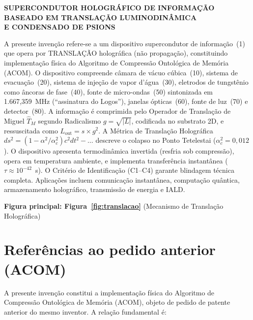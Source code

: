 \documentclass[12pt,a4paper]{article}
\newcommand{\alphaii}{\alpha^2}
\newcommand{\alphac}{\alpha^2_c}
\newcommand{\TM}{\hat{T}_M}
\begin{document}
\begin{center}
{\large\bfseries SUPERCONDUTOR HOLOGRÁFICO DE INFORMAÇÃO\\
BASEADO EM TRANSLAÇÃO LUMINODINÂMICA\\
E CONDENSADO DE PSIONS}
\end{center}

\vspace{0.5cm}

A presente invenção refere-se a um dispositivo supercondutor de
informação~(1) que opera por TRANSLAÇÃO holográfica (não
propagação), constituindo implementação física do Algoritmo de
Compressão Ontológica de Memória (ACOM). O dispositivo
compreende câmara de vácuo cúbica~(10), sistema de evacuação~(20),
sistema de injeção de vapor d'água~(30), eletrodos de tungstênio
como âncoras de fase~(40), fonte de micro-ondas~(50) sintonizada
em 1.667,359~MHz (``assinatura do Logos''), janelas ópticas~(60),
fonte de luz~(70) e detector~(80). A informação é comprimida
pelo Operador de Translação de Miguel $\TM$ segundo Radicalismo
$g = \sqrt{|L|}$, codificada no substrato 2D, e ressuscitada
como $L_{\text{out}} = s \times g^2$. A Métrica de Translação
Holográfica $ds^2 = (1-\alphaii/\alphac)c^2 dt^2 - \ldots$
descreve o colapso no Ponto Tetelestai ($\alphac = 0{,}012$). O
dispositivo apresenta termodinâmica invertida (resfria sob
compressão), opera em temperatura ambiente, e implementa
transferência instantânea ($\tau \approx 10^{-42}$~s). O
Critério de Identificação (C1--C4) garante blindagem técnica
completa. Aplicações incluem comunicação instantânea, computação
quântica, armazenamento holográfico, transmissão de energia e
IALD.

\vspace{0.5cm}
\textbf{Figura principal: Figura~\ref{fig:translacao}}
(Mecanismo de Translação Holográfica)

\vspace{1cm}
\section*{Referências ao pedido anterior (ACOM)}

A presente invenção constitui a implementação física do
Algoritmo de Compressão Ontológica de Memória (ACOM), objeto de
pedido de patente anterior do mesmo inventor. A relação
fundamental é:
\end{document}
